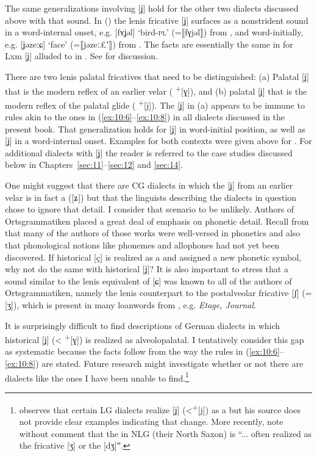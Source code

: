 \begin{xlist}
The same generalizations involving [ʝ] hold for the other two dialects discussed above with that sound. In  () the lenis fricative [ʝ] surfaces as a nonstrident sound in a word-internal onset, e.g. [fʏʝǝl] ‘bird-\textsc{pl}’ (=⟦fγjǝl⟧) from , and word-initially, e.g. [ʝǝzeːɕ] ‘face’ (=⟦jǝzeː£ʽ⟧) from . The facts are essentially the same in for Lxm [ʝ] alluded to in . See \citet{Gilles1999} for discussion.

There are two lenis palatal fricatives that need to be distinguished: (a) Palatal [ʝ] that is the modern reflex of an earlier velar ( \textsuperscript{+}[ɣ]), and (b) palatal [ʝ] that is the modern reflex of the palatal glide ( \textsuperscript{+}[j]). The [ʝ] in (a) appears to be immune to  rules akin to the ones in (\ref{ex:10:6}--\ref{ex:10:8}) in all dialects discussed in the present book. That generalization holds for [ʝ] in word-initial position, as well as [ʝ] in a word-internal onset. Examples for both contexts were given above for . For additional dialects with [ʝ] the reader is referred to the case studies discussed below in Chapters~\ref{sec:11}--\ref{sec:12} and \ref{sec:14}.

One might suggest that there are CG dialects in which the [ʝ] from an earlier velar is in fact a  ([ʑ]) but that the linguists describing the dialects in question chose to ignore that detail. I consider that scenario to be unlikely. Authors of Ortsgrammatiken placed a great deal of emphasis on phonetic detail. Recall from  that many of the authors of those works were well-versed in phonetics and also that phonological notions like phonemes and allophones had not yet been discovered. If historical [ç] is realized as a  and assigned a new phonetic symbol, why not do the same with historical [ʝ]? It is also important to stress that a sound similar to the lenis equivalent of [ɕ] was known to all of the authors of Ortsgrammatiken, namely the lenis counterpart to the postalveolar fricative [ʃ] (=[ʒ]), which is present in many loanwords from , e.g. \textit{Etage, Journal}.

It is surprisingly difficult to find descriptions of German dialects in which historical [ʝ] (< \textsuperscript{+}[ɣ]) is realized as alveolopalatal. I tentatively consider this gap as systematic because the facts follow from the way the  rules in (\ref{ex:10:6}--\ref{ex:10:8}) are stated. Future research might investigate whether or not there are dialects like the ones I have been unable to find.\footnote{\citet[369--370]{Schirmunski1962} observes that certain LG dialects realize [ʝ] (<\textsuperscript{+}[j]) as a  but his source \citep{Grimme1922} does not provide clear examples indicating that change. More recently, \citet[42]{GoltzWalker1989} note without comment that the  in NLG (their North Saxon) is “... often realized as the fricative [ʒ] or the  [dʒ]ˮ.}


\end{xlist}
